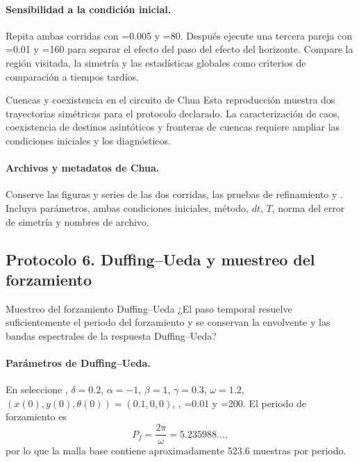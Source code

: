 \paragraph{Sensibilidad a la condición inicial.}
Repita ambas corridas con =0.005 y =80. Después
ejecute una tercera pareja con =0.01 y =160 para
separar el efecto del paso del efecto del horizonte. Compare la región visitada,
la simetría y las estadísticas globales como criterios de comparación a tiempos
tardíos.

\begin{cajaalerta}{Cuencas y coexistencia en el circuito de Chua}
Esta reproducción muestra dos trayectorias simétricas para el protocolo
declarado. La caracterización de caos, coexistencia de destinos asintóticos y fronteras de cuencas requiere ampliar las condiciones iniciales y los diagnósticos.
\end{cajaalerta}

\paragraph{Archivos y metadatos de Chua.}
Conserve las figuras y series de las dos corridas, las pruebas de refinamiento y
. Incluya parámetros, ambas condiciones
iniciales, método, \(dt\), \(T\), norma del error de simetría y nombres de
archivo.

\subsection{Protocolo 6. Duffing--Ueda y muestreo del forzamiento}

\begin{cajaazul}{Muestreo del forzamiento Duffing--Ueda}
¿El paso temporal resuelve suficientemente el periodo del forzamiento y se
conservan la envolvente y las bandas espectrales de la respuesta Duffing--Ueda?
\end{cajaazul}

\paragraph{Parámetros de Duffing--Ueda.}
En  seleccione ,
\(\delta=0.2\), \(\alpha=-1\), \(\beta=1\), \(\gamma=0.3\),
\(\omega=1.2\), \((x(0),y(0),\theta(0))=(0.1,0,0)\),
, =0.01 y
=200. El periodo de forzamiento es
\[
  P_f=\frac{2\pi}{\omega}=5.235988\ldots,
\]
por lo que la malla base contiene aproximadamente 523.6 muestras por periodo.

